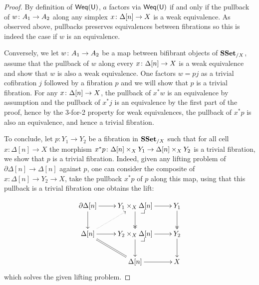 \documentclass[reqno,10pt,a4paper,oneside,draft]{amsart}
\begin{document}
\begin{proof} By definition of $\mathsf{Weq}(\mathsf{U})$, $a$ factors via $\mathsf{Weq}(\mathsf{U})$ if and only if the pullback of $w \colon A_1 \to A_2$ along any simplex $x \colon \Delta[n] \rightarrow X$  is a weak equivalence. As observed above, pullbacks preserves equivalences between fibrations so this is indeed the case if $w$ is an equivalence.

Conversely,
we let $w \colon A_1 \rightarrow A_2$ be a map between bifibrant objects of $\mathbf{SSet}_{/X}$, assume that the pullback of $w$ along every $x \colon \Delta[n] \rightarrow X$ is a weak equivalence and show that $w$ is also a weak equivalence. One factors $w = p j$ as a trivial cofibration $j$ followed by a fibration $p$ and we will show that $p$ is a trivial fibration. For any $x \colon \Delta[n] \rightarrow X$, the pullback of $x^* w$ is an equivalence by assumption and the pullback of $x^* j$ is an equivalence by the first part of the proof, hence by the 3-for-2 property for weak equivalences, the pullback of $x^* p$ is also an equivalence, and hence a trivial fibration.

To conclude, let $p : Y_1 \rightarrow Y_2$ be a fibration in $\mathbf{SSet}_{/X}$ such that for all cell $x: \Delta[n] \rightarrow X$ the morphism $x^* p \colon \Delta[n]\times_X Y_1 \rightarrow \Delta[n] \times_X Y_2$ is a trivial fibration, we show that $p$ is a trivial fibration. Indeed, given any lifting problem of $\partial \Delta[n] \rightarrow \Delta[n]$ against $p$, one can consider the composite of $x: \Delta[n] \rightarrow Y_2 \rightarrow X$, take the pullback $x^* p$ of $p$ along this map, using that this pullback is a trivial fibration one obtains the lift:

\[\xymatrix{
\partial \Delta[n] \ar[d] \ar[r] & Y_1 \times_X \Delta[n] \drpullback \ar[r] \ar@{->>}[d] & Y_1 \ar@{->>}[d] \\
\Delta[n] \ar[r] \ar@{.>}[ur] \ar@{=}[dr] & Y_2 \times_X \Delta[n] \drpullback \ar[r] \ar[d] & Y_2 \ar[d] \\
& \Delta[n] \ar[r] & X
}
\]
which solves the given lifting problem.
\end{proof}
\end{document}
